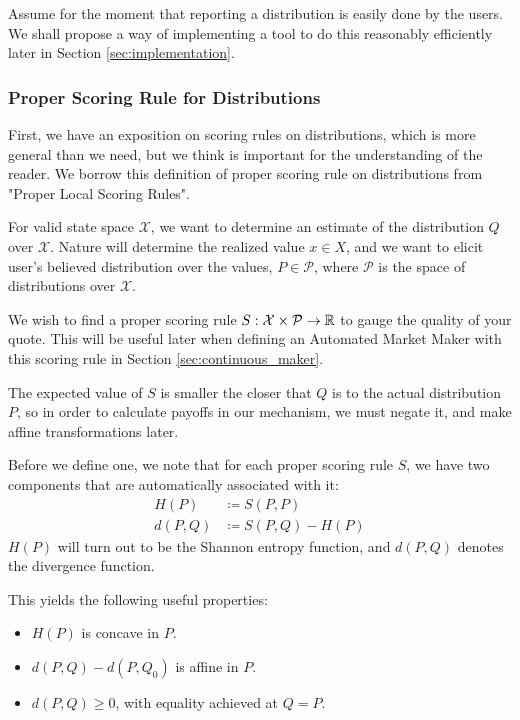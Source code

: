 Assume for the moment that reporting a distribution is easily done by the users. We shall propose a way of implementing a tool to do this reasonably efficiently later in Section \ref{sec:implementation}.

\subsubsection{Proper Scoring Rule for Distributions}
\label{sec:continuous_scoring_rule}
First, we have an exposition on scoring rules on distributions, which is more general than we need, but we think is important for the understanding of the reader. We borrow this definition of proper scoring rule on distributions from "Proper Local Scoring Rules".  \cite{distributions}

For valid state space $\mathcal{X}$, we want to determine an estimate of the distribution $Q$ over $\mathcal{X}$. Nature will determine the realized value $x\in X$, and we want to elicit user's believed distribution over the values, $P\in \mathcal{P}$, where $\mathcal{P}$ is the space of distributions over $\mathcal{X}$.

We wish to find a proper scoring rule $S: \mathcal{X}
\times \mathcal{P} \rightarrow \mathbb{R}$ to gauge the quality of your quote. This will be useful later when defining an Automated Market Maker with this scoring rule in Section \ref{sec:continuous_maker}. 

The expected value of $S$ is smaller the closer that $Q$ is to the actual distribution $P$, so in order to calculate payoffs in our mechanism, we must negate it, and make affine transformations later.

Before we define one, we note that for each proper scoring rule $S$, we have two components that are automatically associated with it:
\begin{align}
H(P) &\coloneqq S(P,P) \\
d(P,Q) &\coloneqq S(P,Q) - H(P)
\end{align}
$H(P)$ will turn out to be the Shannon entropy function, and $d(P,Q)$ denotes the divergence function.

This yields the following useful properties:
\begin{itemize}
\item $H(P)$ is concave in $P$.
\item $d(P,Q) - d(P,Q_0)$ is affine in $P$.
\item $d(P,Q) \ge 0$, with equality achieved at $Q=P$. 
\end{itemize}

